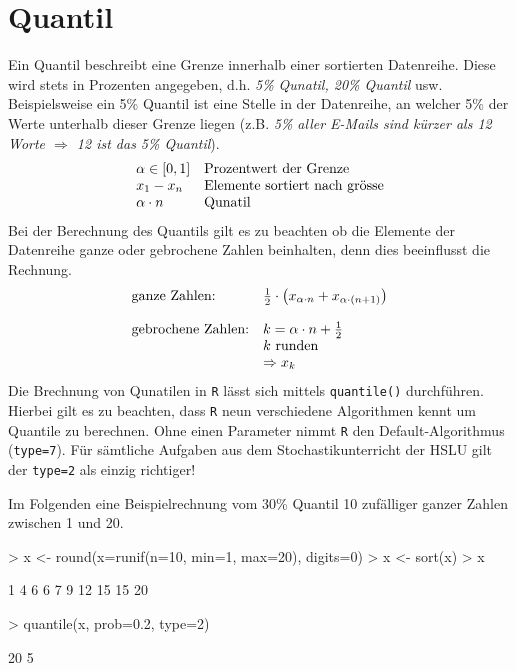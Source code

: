 \section{Quantil}
Ein \gls{Quantil} beschreibt eine Grenze innerhalb einer sortierten 
Datenreihe. Diese wird stets in Prozenten angegeben, d.h. 
\emph{5\% Qunatil, 20\% Quantil} usw. 
Beispielsweise ein 5\% Quantil ist eine Stelle in der Datenreihe, an 
welcher 5\% der Werte unterhalb dieser Grenze liegen (z.B. \emph{5\% 
aller E-Mails sind kürzer als 12 Worte $\Rightarrow$ 12 ist das 5\%
Quantil}).
\[ \begin{array}{l l}
	\alpha \in [0, 1] 
		& \text{Prozentwert der Grenze} \\
	x_1 - x_n
		& \text{Elemente sortiert nach grösse} \\
	\alpha \cdot n 
		& \text{Qunatil} \\
\end{array} \]
Bei der Berechnung des Quantils gilt es zu beachten ob die Elemente 
der Datenreihe ganze oder gebrochene Zahlen beinhalten, denn dies 
beeinflusst die Rechnung.
\[ \begin{array}{l l}
	\text{ganze Zahlen:}
		& \frac{1}{2} \cdot \left(
			x_{\alpha \cdot n} 
			+ x_{\alpha \cdot (n + 1)} \right)  \\
	& \\
	\text{gebrochene Zahlen:}
		& k = \alpha \cdot n + \frac{1}{2}  \\
		& k \text{ runden} \\
		& \Rightarrow x_{k}
\end{array} \]
Die Brechnung von Qunatilen in \lstinline{R} lässt sich mittels 
\lstinline{quantile()} durchführen. Hierbei gilt es zu beachten, dass
\lstinline{R} neun verschiedene Algorithmen kennt um Quantile zu 
berechnen. Ohne einen Parameter nimmt \lstinline{R} den 
Default-Algorithmus (\lstinline{type=7}). Für sämtliche Aufgaben aus dem
Stochastikunterricht der HSLU gilt der \lstinline{type=2} als einzig
richtiger! 

Im Folgenden eine Beispielrechnung vom 30\% \gls{Quantil} 10 zufälliger 
ganzer Zahlen zwischen 1 und 20.
\begin{Schunk}
\begin{Sinput}
> x <- round(x=runif(n=10, min=1, max=20), digits=0)
> x <- sort(x)
> x
\end{Sinput}
\begin{Soutput}
 [1]  1  4  6  6  7  9 12 15 15 20
\end{Soutput}
\begin{Sinput}
> quantile(x, prob=0.2, type=2)
\end{Sinput}
\begin{Soutput}
20%
  5 
\end{Soutput}
\end{Schunk}

